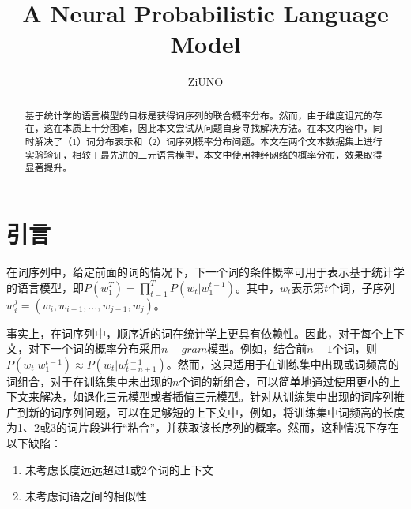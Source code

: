 \documentclass[UTF8]{ctexart}
\title{A Neural Probabilistic Language Model}
\author{ZiUNO}
\date{}
\begin{document}
\maketitle
\begin{abstract}
基于统计学的语言模型的目标是获得词序列的联合概率分布。然而，由于维度诅咒的存在，这在本质上十分困难，因此本文尝试从问题自身寻找解决方法。在本文内容中，同时解决了（1）词分布表示和（2）词序列概率分布问题。本文在两个文本数据集上进行实验验证，相较于最先进的三元语言模型，本文中使用神经网络的概率分布，效果取得显著提升。
\end{abstract}
\section{引言}
\par{在词序列中，给定前面的词的情况下，下一个词的条件概率可用于表示基于统计学的语言模型，即$P(w_{1}^T)=\prod_{t=1}^TP(w_{t}|w_{1}^{t-1})$。其中，$w_{t}$表示第$t$个词，子序列$w_{i}^j=(w_{i},w_{i+1},\dots,w_{j-1},w_{j})$。}
\par{事实上，在词序列中，顺序近的词在统计学上更具有依赖性。因此，对于每个上下文，对下一个词的概率分布采用$n-gram$模型。例如，结合前$n-1$个词，则$P(w_{t}|w_{1}^{t-1})\approx P(w_{t}|w_{t-n+1}^{t-1})$。然而，这只适用于在训练集中出现或词频高的词组合，对于在训练集中未出现的$n$个词的新组合，可以简单地通过使用更小的上下文来解决，如退化三元模型或者插值三元模型。针对从训练集中出现的词序列推广到新的词序列问题，可以在足够短的上下文中，例如，将训练集中词频高的长度为1、2或3的词片段进行“粘合”，并获取该长序列的概率。然而，这种情况下存在以下缺陷：}
\begin{enumerate}
  \item 未考虑长度远远超过1或2个词的上下文
  \item 未考虑词语之间的相似性
\end{enumerate}
\end{document}
